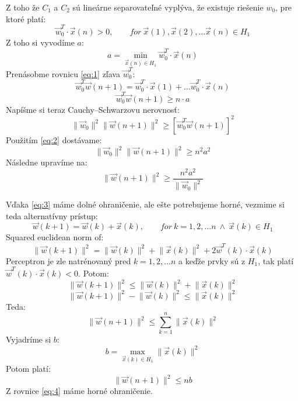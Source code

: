 \documentclass{article}
\numberwithin{equation}{section} %
\begin{document}
Z toho že $C_1$ a $C_2$ sú lineárne separovateľné vyplýva, že existuje riešenie $w_0$, pre ktoré platí:
$$\overrightarrow{w}_0^T \cdot \overrightarrow{x}(n) > 0, \qquad for~ \overrightarrow{x}(1), \overrightarrow{x}(2), \ldots \overrightarrow{x}(n) \in H_1$$
Z toho si vyvodíme $a$:
$$a = \min_{\overrightarrow{x}(n) \in H_1}{\overrightarrow{w}_0^T \cdot\overrightarrow{x}(n)} $$
Prenásobme rovnicu \ref{eq:1} zľava $\overrightarrow{w}_0^T$:
$$\overrightarrow{w}_0^T\overrightarrow{w}(n+1) = \overrightarrow{w}^T_0\cdot\overrightarrow{x}(1) + \ldots \overrightarrow{w}_0^T\cdot\overrightarrow{x}(n)$$
\begin{equation}\label{eq:2}
\overrightarrow{w}_0^T\overrightarrow{w}(n+1) \geq n\cdot a
\end{equation}
Napíšme si teraz Cauchy--Schwarzovu nerovnosť:
$$\lVert \overrightarrow{w}_0 \rVert^2 \lVert \overrightarrow{w}(n+1) \rVert ^2 \geq [\overrightarrow{w}_0^T \overrightarrow{w}(n+1)]^2$$
Použitím \ref{eq:2} dostávame:
$$\lVert \overrightarrow{w}_0 \rVert^2 \lVert \overrightarrow{w}(n+1) \rVert ^2 \geq n^2a^2$$
Následne upravíme na:
\begin{equation}\label{eq:3}
\lVert \overrightarrow{w}(n+1) \rVert ^2 \geq \frac{n^2a^2}{\lVert \overrightarrow{w}_0 \rVert^2}
\end{equation}

Vďaka \ref{eq:3} máme dolné ohraničenie, ale ešte potrebujeme horné, vezmime si teda alternatívny prístup:
$$\overrightarrow{w}(k+1) = \overrightarrow{w}(k) + \overrightarrow{x}(k), \qquad for~ k = 1, 2, \ldots n ~\land~ \overrightarrow{x}(k) \in H_1$$
Squared euclidean norm of:
$$\lVert \overrightarrow{w}(k+1)\rVert^2 = \lVert \overrightarrow{w}(k)\rVert^2 + \lVert \overrightarrow{x}(k)\rVert^2 + 2\overrightarrow{w}^T(k)\cdot\overrightarrow{x}(k)$$
Perceptron je zle natrénovaný pred $k = 1,2, \ldots n$ a keďže prvky sú z $H_1$, tak platí $\overrightarrow{w}^T(k)\cdot\overrightarrow{x}(k) < 0$. Potom:
$$\lVert \overrightarrow{w}(k+1) \rVert^2 \leq \lVert \overrightarrow{w}(k) \rVert^2 + \lVert \overrightarrow{x}(k) \rVert^2$$
$$\lVert \overrightarrow{w}(k+1) \rVert^2 - \lVert \overrightarrow{w}(k) \rVert^2\leq \lVert \overrightarrow{x}(k) \rVert^2$$
Teda:
$$\lVert \overrightarrow{w}(n+1) \rVert^2 \leq \sum_{k=1}^{n} \lVert \overrightarrow{x}(k)\rVert^2 $$
Vyjadríme si $b$:
$$b = \max_{\overrightarrow{x}(k) \in H_1}{\lVert \overrightarrow{x}(k) \rVert ^2}$$
Potom platí:
\begin{equation}\label{eq:4}
\lVert \overrightarrow{w}(n+1) \rVert^2 \leq nb
\end{equation}
Z rovnice \ref{eq:4} máme horné ohraničenie.
\end{document}

